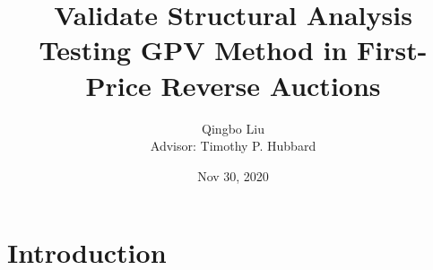 \documentclass[11pt]{article}
\title{%
    Validate Structural Analysis \\ 
    \large Testing GPV Method in First-Price Reverse Auctions}
\author{Qingbo Liu\\[0.5cm]{\small Advisor: Timothy P. Hubbard}}
\date{Nov 30, 2020}
\begin{document}
\maketitle

\section{Introduction}


\end{document}
